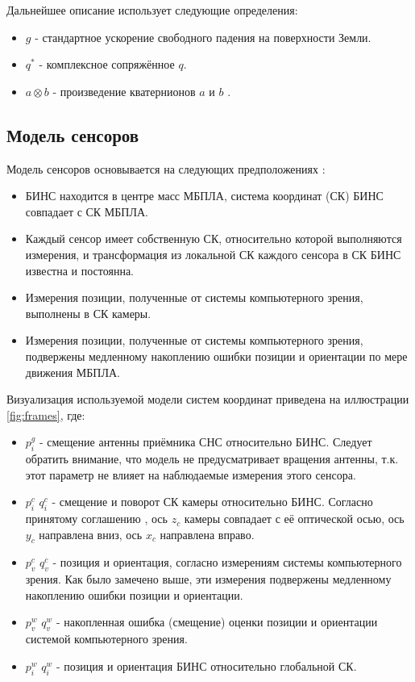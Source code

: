 \documentclass[12pt,a4paper]{article}
\begin{document}
Дальнейшее описание использует следующие определения:

\begin{itemize}
    \item $g$ - стандартное ускорение свободного падения на поверхности Земли.
    \item $q^*$ - комплексное сопряжённое $q$.
    \item $a \otimes b$ - произведение кватернионов $a$ и $b$ \cite{QuaternionsMadgwick}.
\end{itemize}

\subsection{Модель сенсоров}

Модель сенсоров основывается на следующих предположениях \cite{weiss2012vision}:

\begin{itemize}
    \item БИНС находится в центре масс МБПЛА, система координат (СК) БИНС совпадает с СК МБПЛА.
    \item Каждый сенсор имеет собственную СК, относительно которой выполняются измерения, и трансформация из локальной СК каждого сенсора в СК БИНС известна и постоянна.
    \item Измерения позиции, полученные от системы компьютерного зрения, выполнены в СК камеры.
    \item Измерения позиции, полученные от системы компьютерного зрения, подвержены медленному накоплению ошибки позиции и ориентации по мере движения МБПЛА.
\end{itemize}

Визуализация используемой модели систем координат приведена на иллюстрации \ref{fig:frames}, где:

\begin{itemize}
    \item $p_i^g$ - смещение антенны приёмника СНС относительно БИНС. Следует обратить внимание, что модель не предусматривает вращения антенны, т.к. этот параметр не влияет на наблюдаемые измерения этого сенсора.
    \item $p_i^c$ $q_i^c$ - смещение и поворот СК камеры относительно БИНС. Согласно принятому соглашению \cite{ROSFrames}, ось $z_c$ камеры совпадает с её оптической осью, ось $y_c$ направлена вниз, ось $x_c$ направлена вправо.
    \item $p_v^c$ $q_v^c$ - позиция и ориентация, согласно измерениям системы компьютерного зрения. Как было замечено выше, эти измерения подвержены медленному накоплению ошибки позиции и ориентации.
    \item $p_v^w$ $q_v^w$ - накопленная ошибка (смещение) оценки позиции и ориентации системой компьютерного зрения.
    \item $p_i^w$ $q_i^w$ - позиция и ориентация БИНС относительно глобальной СК.
\end{itemize}
\end{document}
